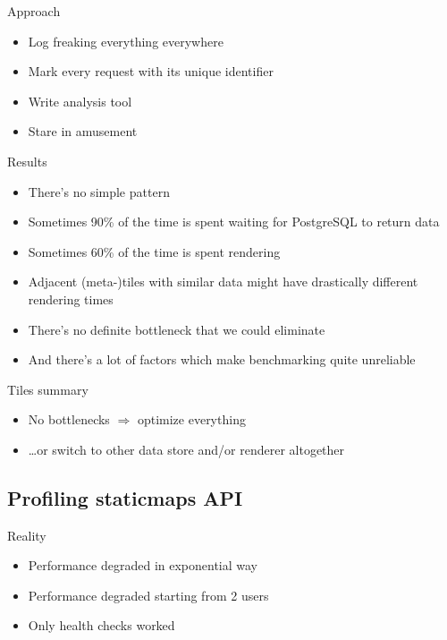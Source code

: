 \documentclass[16pt]{beamer}
\begin{document}
\begin{frame}{Approach}
  \begin{itemize}
  \item Log freaking everything everywhere
  \item Mark every request with its unique identifier
  \item Write analysis tool
  \item Stare in amusement
  \end{itemize}
\end{frame}

\begin{frame}{Results}
  \begin{itemize}
  \item There's no simple pattern
  \item Sometimes 90\% of the time is spent waiting for PostgreSQL to return data
  \item Sometimes 60\% of the time is spent rendering
  \item Adjacent (meta-)tiles with similar data might have drastically different rendering times
  \item There's no definite bottleneck that we could eliminate
  \item And there's a lot of factors which make benchmarking quite unreliable
  \end{itemize}
\end{frame}

\begin{frame}{Tiles summary}
  \begin{itemize}
  \item No bottlenecks \(\Rightarrow\) optimize everything
  \item \ldots or switch to other data store and/or renderer altogether
  \end{itemize}
\end{frame}

\subsection{Profiling staticmaps API}

\begin{frame}{Reality}
  \begin{itemize}
  \item Performance degraded in exponential way
  \item Performance degraded starting from 2 users
  \item Only health checks worked
  \end{itemize}
\end{frame}
\end{document}
